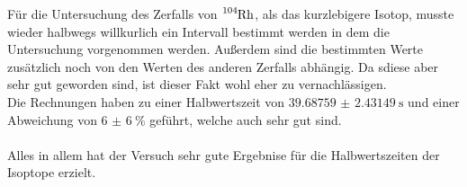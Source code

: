Für die Untersuchung des Zerfalls von $\ce{^{104}_{}Rh}$, als das kurzlebigere Isotop, musste wieder halbwegs willkurlich ein Intervall bestimmt werden in dem die Untersuchung vorgenommen werden.
Außerdem sind die bestimmten Werte zusätzlich noch von den Werten des anderen Zerfalls abhängig. Da sdiese aber sehr gut geworden sind, ist dieser Fakt wohl eher zu vernachlässigen.\\
Die Rechnungen haben zu einer Halbwertszeit von $\SI{39.68759(243149)}{\second}$ und einer Abweichung von $\SI{6(6)}{\percent}$ geführt, welche auch sehr gut sind.\\\\
Alles in allem hat der Versuch sehr gute Ergebnise für die Halbwertszeiten der Isoptope erzielt.
\newpage



